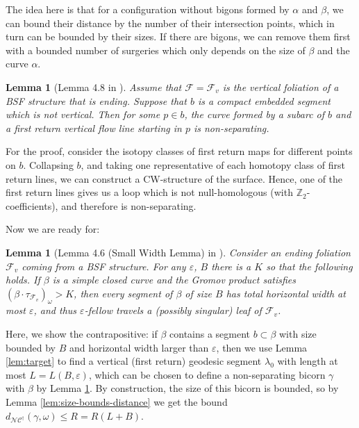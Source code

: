 \documentclass[a4paper]{article}
\let\epsilon\varepsilon %
\newtheorem{lemma}[theorem]{Lemma}
\newcommand{\ZZ}{\mathbb{Z}}
\newcommand{\fncg}{\mathcal{NC}^\dagger}
\begin{document}
The idea here is that for a configuration without bigons formed by $\alpha$ and $\beta$, we can bound their distance by the number of their intersection points, which in turn can be bounded by their sizes.
If there are bigons, we can remove them first with a bounded number of surgeries which only depends on the size of $\beta$ and the curve $\alpha$.

\begin{lemma}[Lemma 4.8 in \cite{BHW2}]\label{lem:bicorn-existence}
Assume that $\mathcal{F}= \mathcal{F}_v$ is the vertical foliation of a BSF structure that is ending.
Suppose that $b$ is a compact embedded segment which is not vertical.
Then for some $p\in b$, the curve formed by a subarc of $b$ and a first return vertical flow line starting in $p$ is non-separating.
\end{lemma}    

For the proof, consider the isotopy classes of first return maps for different points on $b$.
Collapsing $b$, and taking one representative of each homotopy class of first return lines, we can construct a CW-structure of the surface.
Hence, one of the first return lines gives us a loop which is not null-homologous (with $\ZZ_2$-coefficients), and therefore is non-separating.

Now we are ready for:

\begin{lemma}[Lemma 4.6 (Small Width Lemma) in \cite{BHW2}]\label{lem:small-width}
Consider an ending foliation $\mathcal{F}_v$ coming from a BSF structure.
For any $\epsilon$, $B$ there is a $K$ so that the following holds.
If $\beta$ is a simple closed curve and the Gromov product satisfies $(\beta\cdot \tau_{\mathcal{F}_v})_{\omega}>K$, then every segment of $\beta$ of size $B$ has total horizontal width at most $\epsilon$, and thus $\epsilon$-fellow travels a (possibly singular) leaf of $\mathcal{F}_v$.
\end{lemma}

Here, we show the contrapositive:
if $\beta$ contains a segment $b\subset \beta$ with size bounded by $B$ and horizontal width larger than $\epsilon$, then we use Lemma \ref{lem:target} to find a vertical (first return) geodesic segment $\lambda_0$ with length at most $L=L(B,\epsilon)$, which can be chosen to define a non-separating bicorn $\gamma$ with $\beta$ by Lemma \ref{lem:bicorn-existence}. 
By construction, the size of this bicorn is bounded, so by Lemma \ref{lem:size-bounds-distance} we get the bound $d_{\fncg}(\gamma, \omega) \leq R = R(L+B)$.
\end{document}
